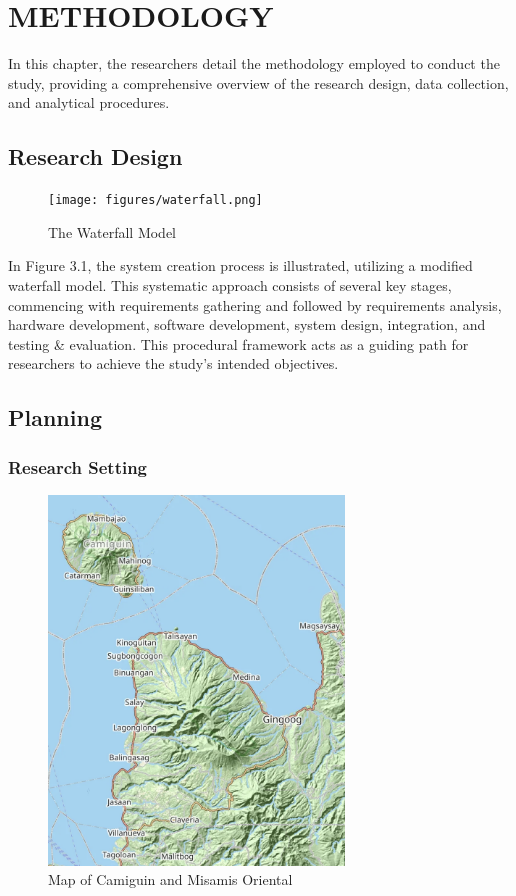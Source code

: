 
\chapter{METHODOLOGY}
{\baselineskip

In this chapter, the researchers detail the methodology employed to conduct the study, providing a comprehensive overview of the research design, data collection, and analytical procedures.

\section{Research Design}

\begin{figure}[H]
	\centering
	\caption{The Waterfall Model}
	\label{fig:waterfall}
	\texttt{[image: figures/waterfall.png]}
\end{figure}

In Figure 3.1, the system creation process is illustrated, utilizing a modified waterfall model. This systematic approach consists of several key stages, commencing with requirements gathering and followed by requirements analysis, hardware development, software development, system design, integration, and testing \& evaluation. This procedural framework acts as a guiding path for researchers to achieve the study's intended objectives.

\section{Planning}
\subsection{Research Setting}

\begin{figure}[H]
	\centering
	\caption{Map of Camiguin and Misamis Oriental}
	\label{fig:map}
	\includegraphics[width=0.7\textwidth]{figures/map.png}
\end{figure}

}
